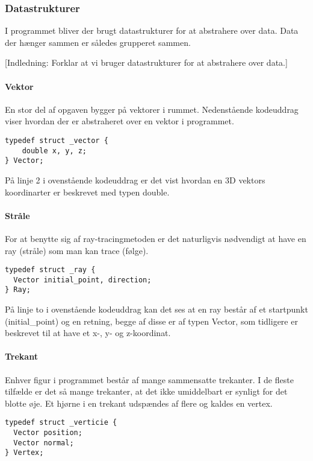 \subsubsection{Datastrukturer}
I programmet bliver der brugt datastrukturer for at abstrahere over data. Data der hænger sammen er således grupperet sammen. 

[Indledning: Forklar at vi bruger datastrukturer for at abstrahere over data.]
\paragraph{Vektor}
En stor del af opgaven bygger på vektorer i rummet. Nedenstående kodeuddrag viser hvordan der er abstraheret over en vektor i programmet. 

\begin{lstlisting}[style=Cstyle, caption=Struct til vektor]
typedef struct _vector {
    double x, y, z;
} Vector;
\end{lstlisting}

På linje 2 i ovenstående kodeuddrag er det vist hvordan en 3D vektors koordinarter er beskrevet med typen double. 

\paragraph{Stråle}
For at benytte sig af ray-tracingmetoden er det naturligvis nødvendigt at have en ray (stråle) som man kan trace (følge). 

\begin{lstlisting}[style=Cstyle, caption=Struct til ray]
typedef struct _ray {
  Vector initial_point, direction;
} Ray;
\end{lstlisting}

På linje to i ovenstående kodeuddrag kan det ses at en ray består af et startpunkt (initial\_point) og en retning, begge af disse er af typen Vector, som tidligere er beskrevet til at have et x-, y- og z-koordinat.

\paragraph{Trekant}
Enhver figur i programmet består af mange sammensatte trekanter. I de fleste tilfælde er det så mange trekanter, at det ikke umiddelbart er synligt for det blotte øje. Et hjørne i en trekant udspændes af flere og kaldes en vertex.
    
\begin{lstlisting}[style=Cstyle, caption=Struct til vertex]
typedef struct _verticie {
  Vector position;
  Vector normal;
} Vertex;
\end{lstlisting}

